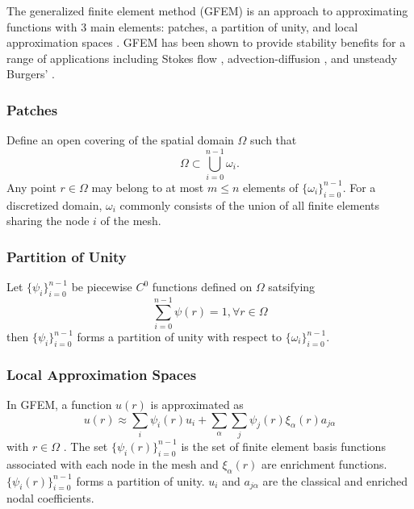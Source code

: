 The generalized finite element method (GFEM) is an approach to approximating functions with 3 main elements: patches, a partition of unity, and local approximation spaces \cite{shilt2021high}.  GFEM has been shown to provide stability benefits for a range of applications including Stokes flow \cite{SHILT2020113165}, advection-diffusion \cite{SHILT2021113889}, and unsteady Burgers' \cite{shilt2021high}.


\subsubsection{Patches} \label{sec:patches}

Define an open covering of the spatial domain $\Omega$ such that
\begin{equation}
\Omega\subset\bigcup_{i=0}^{n-1} \omega_i.
\end{equation}
Any point $r\in\Omega$ may belong to at most $m\le n$ elements of $\lbrace\omega_i\rbrace_{i=0}^{n-1}$.
For a discretized domain, $\omega_i$ commonly consists of the union of all finite elements sharing the node $i$ of the mesh.

\subsubsection{Partition of Unity}
Let $\lbrace\psi_i\rbrace_{i=0}^{n-1}$ be piecewise $C^0$ functions defined on $\Omega$ satsifying
\begin{equation}
\sum_{i=0}^{n-1} \psi(r) = 1, \forall r\in\Omega
\end{equation}
then $\lbrace\psi_i\rbrace_{i=0}^{n-1}$ forms a partition of unity with respect to $\lbrace\omega_i\rbrace_{i=0}^{n-1}$.

\subsubsection{Local Approximation Spaces}

In GFEM, a function $u(r)$ is approximated as 
\begin{equation}
\label{eq:gfem}
u(r)\approx \sum_i \psi_i(r) u_i + \sum_\alpha \sum_j \psi_j(r)\xi_\alpha(r)a_{j\alpha}
\end{equation}
with $r\in\Omega$ \cite{aquino2009generalized}.  
The set $\lbrace\psi_i(r)\rbrace_{i=0}^{n-1}$ is the set of finite element basis functions associated with each node in the mesh 
and $\xi_\alpha(r)$ are enrichment functions.
$\lbrace\psi_i(r)\rbrace_{i=0}^{n-1}$ forms a partition of unity.
$u_i$ and $a_{j\alpha}$ are the classical and enriched nodal coefficients.

